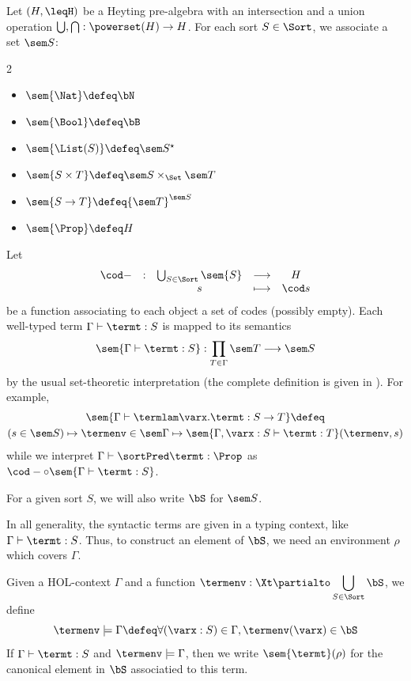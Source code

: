 \begin{definition}[Semantics]\label{def:sem}
  Let $(H,\leqH)$ be a Heyting pre-algebra with an intersection and a union operation $\bigcup,\bigcap : \powerset (H) \to H$.
  For each sort $S \in \Sort$, we associate a set $\sem S$:
  \begin{multicols}{2}
  \begin{itemize}
  \item $\sem{\Nat} \defeq \bN$
  \item $\sem{\Bool} \defeq \bB$
  \item $\sem{\List(S)} \defeq \sem S ^\star$
  \item $\sem{S \times T} \defeq \sem S \times_{\Set} \sem T$
  \item $\sem{S \to T} \defeq {\sem T}^{\sem S}$
  \item $\sem{\Prop} \defeq H$
  \end{itemize}
  \end{multicols}
  \noindent Let
  \[\begin{array}{ccccc}
  \cod - &:& \bigcup_{S \in \Sort} \sem{S} & \longrightarrow & H \\
  & & s &\longmapsto & \cod s
  \end{array}\]
  be a function associating to each object a set of codes (possibly empty).
  Each well-typed term $\Gamma \vdash \termt : S$ is mapped to its semantics
  \[
  \sem{\Gamma \vdash \termt : S} : \prod_{T \in \Gamma} \sem T \longrightarrow \sem S
  \]
  by the usual set-theoretic interpretation (the complete definition is given in ). For example,
  \begin{multline*}
  \sem{\Gamma\vdash \termlam\varx.\termt : S \to T} \defeq\\
  (s \in \sem S) \mapsto \termenv \in \sem\Gamma \mapsto \sem{\Gamma,\varx : S\vdash \termt : T}(\termenv,s)
  \end{multline*}
  while we interpret $\Gamma\vdash \sortPred \termt : \Prop$ as $\cod - \circ \sem{\Gamma\vdash \termt : S}$.

  For a given sort $S$, we will also write $\bS$ for $\sem S$.
\end{definition}

In all generality, the syntactic terms are given in a typing context, like $\Gamma\vdash \termt : S$. Thus, to construct an element of $\bS$, we need an environment $\rho$ which covers $\Gamma$.

\begin{notation}
  Given a HOL-context $\Gamma$ and a function $\displaystyle\termenv : \Xt \partialto \bigcup_{S \in \Sort} \bS$, we define
  \[\termenv\models \Gamma \defeq \forall (\varx : S) \in \Gamma, \termenv(\varx) \in \bS\]
  If $\Gamma \vdash \termt : S$ and $\termenv\models \Gamma$, then we write %
  $\sem{\termt}(\rho)$ for the canonical element in $\bS$ associatied to this term.
\end{notation}
